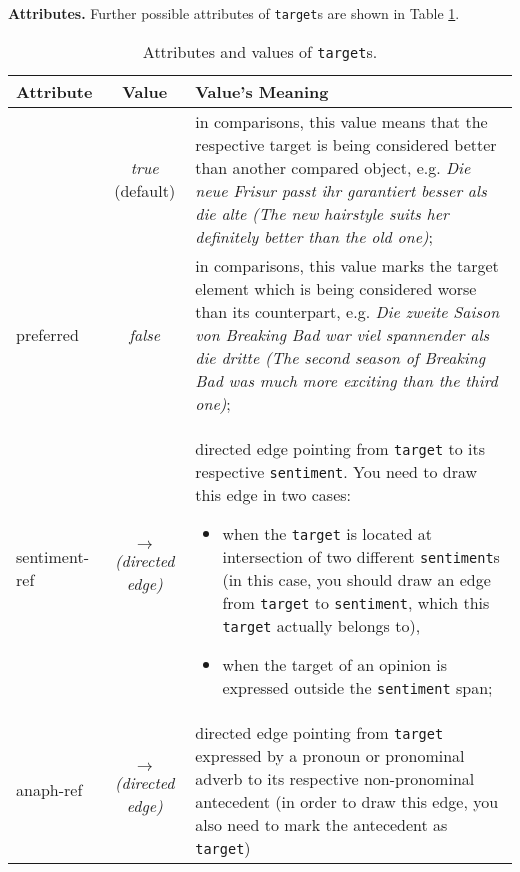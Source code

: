 \documentclass[11pt,a4paper]{article}
\newlength{\clmnwidth}
\theoremstyle{mytheoremstyle}
\begin{document}
\noindent\textbf{Attributes.} Further possible attributes of \texttt{target}s
are shown in Table \ref{tbl:target}.
\begin{center}
  \begin{table}[h]
    \caption{Attributes and values of \texttt{target}s.}
    \begin{tabular}{|l|c|p{0.94\clmnwidth}|}\hline
      Attribute & Value & Value's Meaning\\\hline

      & \textit{true} (default) & in comparisons, this value means that
      the respective target is being considered better than another
      compared object, e.g. \textit{\emph{Die neue Frisur} passt ihr
        garantiert besser als die alte (\emph{The new hairstyle} suits
        her definitely better than the old one)};\\\cline{2-3}

      \multirow{-2}{*}{preferred} & \textit{false} & in comparisons,
      this value marks the target element which is being considered
      worse than its counterpart, e.g. \textit{Die zweite Saison von
        Breaking Bad war viel spannender als \emph{die dritte} (The
        second season of Breaking Bad was much more exciting than
        \emph{the third one})};\\\hline

      sentiment-ref & \textit{$\longrightarrow$\newline(directed
        edge)} & directed edge pointing from \texttt{target} to its
      respective \texttt{sentiment}.  You need to draw this edge in
      two cases:
      \begin{itemize}
      \item when the \texttt{target} is located at intersection of two
        different \texttt{sentiment}s (in this case, you should draw
        an edge from \texttt{target} to \texttt{sentiment}, which this
        \texttt{target} actually belongs to),

      \item when the target of an opinion is expressed outside the
        \texttt{sentiment} span;
      \end{itemize}\\\hline

      anaph-ref & \textit{$\longrightarrow$\newline(directed edge)} &
      directed edge pointing from \texttt{target} expressed by a
      pronoun or pronominal adverb to its respective non-pronominal
      antecedent (in order to draw this edge, you also need to mark
      the antecedent as \texttt{target})\\\hline
    \end{tabular}
    \label{tbl:target}
  \end{table}
\end{center}
\end{document}
